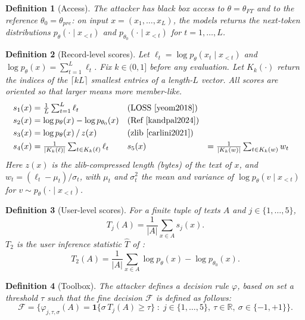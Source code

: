 \documentclass[11pt]{article}
\newtheorem{definition}{Definition}
\theoremstyle{remark}
\newcommand{\Ind}{\mathbf{1}}
\newcommand{\R}{\mathbb{R}}
\newcommand{\F}{\mathcal{F}}
\begin{document}
\begin{definition}[Access]
The attacker has black box access to $\theta = \theta_{FT}$ and to the reference $\theta_0 = \theta_{pre}$:
on input $x = (x_1,\dots,x_L)$, the models returns the next-token distributions
$p_\theta(\cdot \mid x_{<t})$ and $p_{\theta_0}(\cdot \mid x_{<t})$ for $t = 1,\dots,L$.
\end{definition}

\begin{definition}[Record-level scores]
Let $\ell_t = \log p_\theta(x_t \mid x_{<t})$ and $\log p_\theta(x) = \sum_{t=1}^{L} \ell_t$.
Fix $k \in (0,1]$ before any evaluation. Let $K_k(\cdot)$ return the indices of the
$\lceil kL \rceil$ smallest entries of a length-$L$ vector.
All scores are oriented so that larger means more member-like.
\begin{align*}
s_1(x) &= \tfrac{1}{L}\textstyle\sum_{t=1}^{L} \ell_t
  && \text{(LOSS \cite{yeom2018})}\\
s_2(x) &= \log p_\theta(x) - \log p_{\theta_0}(x)
  && \text{(Ref \cite{kandpal2024})}\\
s_3(x) &= \log p_\theta(x) \,/\, z(x)
  && \text{(zlib \cite{carlini2021})}\\
s_4(x) &= \tfrac{1}{|K_k(\ell)|}\textstyle\sum_{t\in K_k(\ell)} \ell_t
  && 
s_5(x) &= \tfrac{1}{|K_k(w)|}\textstyle\sum_{t\in K_k(w)} w_t
  && 
\end{align*}
Here $z(x)$ is the zlib-compressed length (bytes) of the text of $x$, and
$w_t = (\ell_t - \mu_t)/\sigma_t$, with $\mu_t$ and $\sigma_t^2$ the mean and variance of
$\log p_\theta(v \mid x_{<t})$ for $v \sim p_\theta(\cdot \mid x_{<t})$.
\end{definition}

\begin{definition}[User-level scores]
For a finite tuple of texts $A$ and $j \in \{1,\dots,5\}$,
\[
T_j(A) = \frac{1}{|A|} \sum_{x\in A} s_j(x).
\]
$T_2$ is the user inference statistic $\hat{T}$ of \cite{kandpal2024}:
\[
T_2(A) = \frac{1}{|A|} \sum_{x\in A} \log p_\theta(x) - \log p_{\theta_0}(x).
\]
\end{definition}

\begin{definition}[Toolbox]
The attacker defines a decision rule $\varphi$, based on set a threshold $\tau$ such that the fine decision $\F$ is defined as follows:
\[
\F = \bigl\{ \varphi_{j,\tau,\sigma}(A) = \Ind\{\sigma\, T_j(A) \ge \tau\} \;:\;
j \in \{1,\dots,5\},\ \tau \in \R,\ \sigma \in \{-1,+1\} \bigr\}.
\]
\end{definition}
\end{document}
